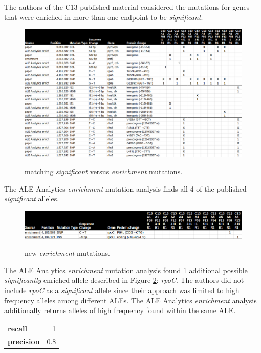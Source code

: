 \documentclass[12pt,final,masters,chapterheads]{ucsd}  %
\begin{document}
The authors of the C13 published material considered the mutations for genes that were enriched in more than one endpoint to be \textit{significant}.

\begin{figure}[h!]
  \caption{matching \textit{significant} versus \textit{enrichment} mutations.}
  \centering
  \includegraphics[width=\textwidth]{c13_matching_enrichment_mutations.png}
  \label{fig:c13_matching_enrichment_mutations}
\end{figure}

The ALE Analytics \textit{enrichment} mutation analysis finds all 4 of the published \textit{significant} alleles.

\begin{figure}[h!]
  \caption{new \textit{enrichment} mutations.}
  \centering
  \includegraphics[width=\textwidth]{c13_new_enrich_muts.png}
  \label{fig:c13_new_enrich_muts}
\end{figure}

The ALE Analytics \textit{enrichment} mutation analysis found 1 additional possible \textit{significantly} enriched allele described in Figure \ref{fig:c13_new_enrich_muts}: \textit{rpoC}. The authors did not include \textit{rpoC} as a \textit{significant} allele since their approach was limited to high frequency alleles among different ALEs. The ALE Analytics \textit{enrichment} analysis additionally returns alleles of high frequency found within the same ALE.
\begin{table}[h!]
\centering
\begin{tabular}{ l r }
  \textbf{recall} & 1 \\
  \textbf{precision} & 0.8 \\
\end{tabular}
\end{table}
\end{document}
